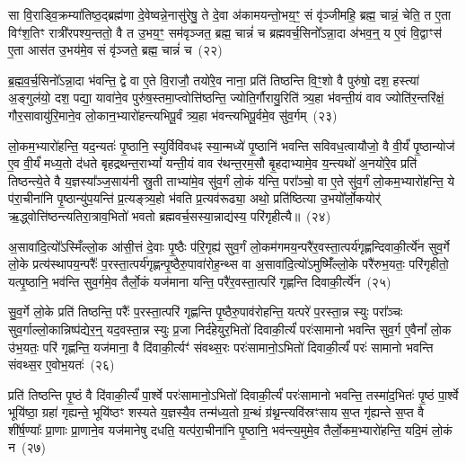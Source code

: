 {\anuvakamend[{ए॒तथ्स॒प्तत्रिꣴ॑श्चच्च}]}%

सा वि॒राड्वि॒क्रम्या॑तिष्ठ॒द्ब्रह्म॑णा दे॒वेष्वन्ने॒नासु॑रेषु॒ ते दे॒वा अ॑कामयन्तो॒भय॒ꣳ॒ सं वृ॑ञ्जीमहि॒ ब्रह्म॒ चान्नं॒ चेति॒ त ए॒ता विꣳ॑श॒तिꣳ रात्री॑रपश्य॒न्ततो॒ वै त उ॒भय॒ꣳ॒ सम॑वृञ्जत॒ ब्रह्म॒ चान्नं॑ च ब्रह्मवर्च॒सिनो᳚\-ऽन्ना॒दा अ॑भव॒न्॒ य ए॒वं वि॒द्वाꣳस॑ ए॒ता आस॑त उ॒भय॑मे॒व सं वृ॑ञ्जते॒ ब्रह्म॒ चान्नं॑ च~(२२)

ब्र॒ह्म॒व॒र्च॒सिनो᳚\-ऽन्ना॒दा भ॑वन्ति॒ द्वे वा ए॒ते वि॒राजौ॒ तयो॑रे॒व नाना॒ प्रति॑ तिष्ठन्ति वि॒ꣳ॒शो वै पुरु॑षो॒ दश॒ हस्त्या॑ अ॒ङ्गुल॑यो॒ दश॒ पद्या॒ यावा॑ने॒व पुरु॑ष॒स्तमा॒प्त्वोत्ति॑ष्ठन्ति॒ ज्योति॒र्गौरायु॒रिति॑ त्र्य॒हा भ॑वन्ती॒यं वाव ज्योति॑र॒न्तरि॑क्षं॒ गौर॒सावायु॑रि॒माने॒व लो॒कान॒भ्यारो॑हन्त्यभिपू॒र्वं त्र्य॒हा भ॑वन्त्यभिपू॒र्वमे॒व सु॑व॒र्गम्~(२३)

लो॒कम॒भ्यारो॑हन्ति॒ यद॒न्यतः॑ पृ॒ष्ठानि॒ स्युर्विवि॑वधꣴ स्या॒न्मध्ये॑ पृ॒ष्ठानि॑ भवन्ति सविवध॒त्वायौजो॒ वै वी॒र्यं॑ पृ॒ष्ठान्योज॑ ए॒व वी॒र्यं॑ मध्य॒तो द॑धते बृहद्रथन्त॒रा\-भ्यां᳚ यन्ती॒यं वाव र॑थन्त॒रम॒सौ बृ॒हदाभ्यामे॒व य॒न्त्यथो॑ अ॒नयो॑रे॒व प्रति॑ तिष्ठन्त्ये॒ते वै य॒ज्ञस्या᳚ञ्ज॒साय॑नी स्रु॒ती ताभ्या॑मे॒व सु॑व॒र्गं लो॒कं य॑न्ति॒ परा᳚ञ्चो॒ वा ए॒ते सु॑व॒र्गं लो॒कम॒भ्यारो॑हन्ति॒ ये प॑रा॒चीना॑नि पृ॒ष्ठान्यु॑प॒यन्ति॑ प्र॒त्यङ्त्र्य॒हो भ॑वति प्र॒त्यव॑रूढ्या॒ अथो॒ प्रति॑ष्ठित्या उ॒भयो᳚र्लो॒कयोर्॑ ऋ॒द्ध्वोत्ति॑ष्ठन्त्यतिरा॒त्राव॒भितो॑ भवतो ब्रह्मवर्च॒सस्या॒न्नाद्य॑स्य॒ परि॑गृहीत्यै॥~(२४)

{\anuvakamend[{वृ॒ञ्ज॒ते॒ ब्रह्म॒ चान्न॑ञ्च सुव॒र्गमे॒ते सु॑व॒र्गन्त्रयो॑विꣳशतिश्च}]}%

अ॒सावा॑दि॒त्यो᳚\-ऽस्मिँल्लो॒क आ॑सी॒त्तं दे॒वाः पृ॒ष्ठैः प॑रि॒गृह्य॑ सुव॒र्गं लो॒कम॑गमय॒न्परै॑र॒वस्ता॒त्पर्य॑गृह्णन्दिवाकी॒र्त्ये॑न सुव॒र्गे लो॒के प्रत्य॑स्थापय॒न्परैः᳚ प॒रस्ता॒त्पर्य॑गृह्णन्पृ॒ष्ठैरु॒पावा॑रोह॒न्थ्स वा अ॒सावा॑दि॒त्यो॑\-ऽमुष्मिँ॑ल्लो॒के परै॑रुभ॒यतः॒ परि॑गृहीतो॒ यत्पृ॒ष्ठानि॒ भव॑न्ति सुव॒र्गमे॒व तैर्लो॒कं यज॑माना यन्ति॒ परै॑र॒वस्ता॒त्परि॑ गृह्णन्ति दिवाकी॒र्त्ये॑न~(२५)

सु॒व॒र्गे लो॒के प्रति॑ तिष्ठन्ति॒ परैः᳚ प॒रस्ता॒त्परि॑ गृह्णन्ति पृ॒ष्ठैरु॒पाव॑रोहन्ति॒ यत्परे॑ प॒रस्ता॒न्न स्युः परा᳚ञ्चः सुव॒र्गाल्लो॒कान्निष्प॑द्येर॒न्॒ यद॒वस्ता॒न्न स्युः प्र॒जा निर्द॑हेयुर॒भितो॑ दिवाकी॒र्त्यं॑ परः॑सामानो भवन्ति सुव॒र्ग ए॒वैनां᳚ लो॒क उ॑भ॒यतः॒ परि॑ गृह्णन्ति॒ यज॑माना॒ वै दि॑वाकी॒र्त्यꣳ॑ संवथ्स॒रः परः॑सामानो॒\-ऽभितो॑ दिवाकी॒र्त्यं॑ परः॑ सामानो भवन्ति संवथ्स॒र ए॒वोभ॒यतः॑~(२६)

प्रति॑ तिष्ठन्ति पृ॒ष्ठं वै दि॑वाकी॒र्त्यं॑ पा॒र्श्वे परः॑सामानो॒\-ऽभितो॑ दिवाकी॒र्त्यं॑ परः॑सामानो भवन्ति॒ तस्मा॑द॒भितः॑ पृ॒ष्ठं पा॒र्श्वे भूयि॑ष्ठा॒ ग्रहा॑ गृह्यन्ते॒ भूयि॑ष्ठꣳ शस्यते य॒ज्ञस्यै॒व तन्म॑ध्य॒तो ग्र॒न्थं ग्र॑थ्न॒न्त्यवि॑स्रꣳसाय स॒प्त गृ॑ह्यन्ते स॒प्त वै शी॑र्\mbox{}ष॒ण्याः᳚ प्रा॒णाः प्रा॒णाने॒व यज॑मानेषु दधति॒ यत्प॑रा॒चीना॑नि पृ॒ष्ठानि॒ भव॑न्त्य॒मुमे॒व तैर्लो॒कम॒भ्यारो॑हन्ति॒ यदि॒मं लो॒कं न~(२७)

